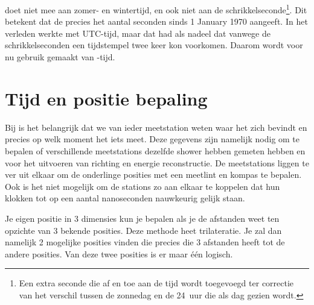 \gps doet niet
mee aan zomer- en wintertijd, en ook niet aan de
schrikkelseconde\footnote{Een extra seconde die af en toe aan de tijd
wordt toegevoegd ter correctie van het verschil tussen de zonnedag en de
\SI{24}{uur} die als dag gezien wordt.}. Dit betekent dat de \gps
precies het aantal seconden sinds 1 January 1970 aangeeft. In het
verleden werkte \hisparc met UTC-tijd, maar dat had als nadeel dat vanwege de schrikkelseconden een
tijdstempel twee keer kon voorkomen. Daarom wordt voor \hisparc nu gebruik gemaakt van \gps-tijd.


\section{Tijd en positie bepaling}

Bij \hisparc is het belangrijk dat we van ieder meetstation weten waar
het zich bevindt en precies op welk moment het iets meet. Deze gegevens
zijn namelijk nodig om te bepalen of verschillende meetstations dezelfde
shower hebben gemeten hebben en voor het uitvoeren van richting en
energie reconstructie. De meetstations liggen te ver uit elkaar om de
onderlinge posities met een meetlint en kompas te bepalen. Ook is het
niet mogelijk om de stations zo aan elkaar te koppelen dat hun klokken
tot op een aantal nanoseconden nauwkeurig gelijk staan.

Je eigen positie in 3 dimensies kun je bepalen als je de afstanden weet ten opzichte van 3 bekende posities. Deze methode heet
trilateratie. Je zal dan namelijk 2 mogelijke posities vinden die precies die 3 afstanden heeft tot de andere posities. Van deze twee posities is er maar \'e\'en logisch.

